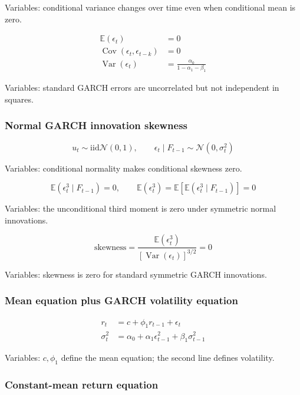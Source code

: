 \documentclass[
  8pt,
  twocolumn]{extarticle}
\begin{document}
Variables: conditional variance changes over time even when conditional
mean is zero.

\[
\begin{aligned}
\mathbb E(\epsilon_t)&=0\\
\operatorname{Cov}(\epsilon_t,\epsilon_{t-k})&=0\\
\operatorname{Var}(\epsilon_t)&=\frac{\alpha_0}{1-\alpha_1-\beta_1}
\end{aligned}
\]

Variables: standard GARCH errors are uncorrelated but not independent in
squares.

\subsubsection{Normal GARCH innovation
skewness}\label{normal-garch-innovation-skewness}

\[
u_t\sim\mathrm{iid}\mathcal N(0,1),\qquad \epsilon_t\mid F_{t-1}\sim\mathcal N(0,\sigma_t^2)
\]

Variables: conditional normality makes conditional skewness zero.

\[
\mathbb E(\epsilon_t^3\mid F_{t-1})=0,\qquad
\mathbb E(\epsilon_t^3)=\mathbb E[\mathbb E(\epsilon_t^3\mid F_{t-1})]=0
\]

Variables: the unconditional third moment is zero under symmetric normal
innovations.

\[
\text{skewness}=\frac{\mathbb E(\epsilon_t^3)}{[\operatorname{Var}(\epsilon_t)]^{3/2}}=0
\]

Variables: skewness is zero for standard symmetric GARCH innovations.

\subsubsection{Mean equation plus GARCH volatility
equation}\label{mean-equation-plus-garch-volatility-equation}

\[
\begin{aligned}
r_t&=c+\phi_1r_{t-1}+\epsilon_t\\
\sigma_t^2&=\alpha_0+\alpha_1\epsilon_{t-1}^2+\beta_1\sigma_{t-1}^2
\end{aligned}
\]

Variables: \(c,\phi_1\) define the mean equation; the second line
defines volatility.

\subsubsection{Constant-mean return
equation}\label{constant-mean-return-equation}
\end{document}
